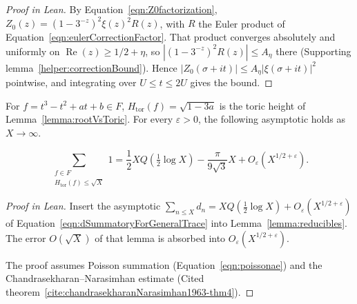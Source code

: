 \begin{proof}[Proof in Lean]

\leanok


By Equation~\ref{eqn:Z0factorization}, $Z_0(z)=(1-3^{-z})^2\xi(z)^2R(z)$, with $R$ the Euler product of Equation~\ref{eqn:eulerCorrectionFactor}. That product converges absolutely and uniformly on $\operatorname{Re}(z)\geq1/2+\eta$, so $|(1-3^{-z})^2R(z)|\leq A_\eta$ there (Supporting lemma~\ref{helper:correctionBound}). Hence $|Z_0(\sigma+it)|\leq A_\eta|\xi(\sigma+it)|^2$ pointwise, and integrating over $U\leq t\leq2U$ gives the bound.

\end{proof}

\begin{equationnode}

\label{eqn:irrPolys}


\leanok

For $f=t^3-t^2+at+b\in F$, $H_{\mathrm{tor}}(f)=\sqrt{1-3a}$ is the toric height of Lemma~\ref{lemma:rootVsToric}. For every $\varepsilon>0$, the following asymptotic holds as $X\to\infty$.

\begin{equation*} \sum_{\substack{f\in F\\H_{\mathrm{tor}}(f)\leq\sqrt X}}1 =\frac12XQ\left(\tfrac12\log X\right) -\frac{\pi}{9\sqrt3}X +O_\varepsilon(X^{1/2+\varepsilon}). \end{equation*}

\end{equationnode}

\begin{proof}[Proof in Lean]

\leanok


Insert the asymptotic $\sum_{n\leq X}d_n=XQ(\frac12\log X)+O_\varepsilon(X^{1/2+\varepsilon})$ of Equation~\ref{eqn:dSummatoryForGeneralTrace} into Lemma~\ref{lemma:reducibles}. The error $O(\sqrt X)$ of that lemma is absorbed into $O_\varepsilon(X^{1/2+\varepsilon})$.

The proof assumes Poisson summation (Equation~\ref{eqn:poissonae}) and the Chandrasekharan--Narasimhan estimate (Cited theorem~\ref{cite:chandrasekharanNarasimhan1963-thm4}).

\end{proof}

